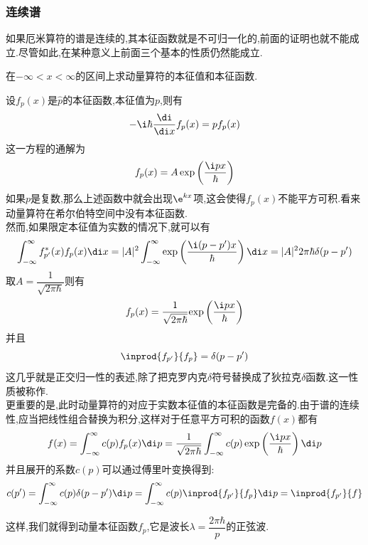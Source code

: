 \documentclass{ctexart}
\begin{document}
\subsubsection{连续谱}
如果厄米算符的谱是连续的,其本征函数就是不可归一化的,前面的证明也就不能成立.尽管如此,在某种意义上前面三个基本的性质仍然能成立.
\begin{problem}
    在$-\infty<x<\infty$的区间上求动量算符的本征值和本征函数.
\end{problem}
\begin{solution}
    设$f_p(x)$是$\hat{p}$的本征函数,本征值为$p$,则有
    \[-\i\hbar\dfrac{\di}{\di x}f_p(x)=pf_p(x)\]
    这一方程的通解为
    \[f_p(x)=A\exp\left(\dfrac{\i px}{\hbar}\right)\]
    如果$p$是复数,那么上述函数中就会出现$\e^{kx}$项,这会使得$f_p(x)$不能平方可积.看来动量算符在希尔伯特空间中没有本征函数.\\
    然而,如果限定本征值为实数的情况下,就可以有
    \[\int_{-\infty}^{\infty}f^\ast_{p'}(x)f_p(x)\di x=|A|^2\int_{-\infty}^{\infty}\exp\left(\dfrac{\i(p-p')x}{\hbar}\right)\di x=|A|^22\pi\hbar\delta(p-p')\]
    取$A=\dfrac{1}{\sqrt{2\pi\hbar}}$则有
    \[f_p(x)=\dfrac{1}{\sqrt{2\pi\hbar}}{\exp\left(\dfrac{\i px}{\hbar}\right)}\]
    并且
    \[\inprod{f_{p'}}{f_p}=\delta(p-p')\]
    这几乎就是正交归一性的表述,除了把克罗内克$\delta$符号替换成了狄拉克$\delta$函数.这一性质被称作.\\
    更重要的是,此时动量算符的对应于实数本征值的本征函数是完备的.由于谱的连续性,应当把线性组合替换为积分,这样对于任意平方可积的函数$f(x)$都有
    \[f(x)=\int_{-\infty}^{\infty}c(p)f_p(x)\di p=\dfrac{1}{\sqrt{2\pi\hbar}}\int_{-\infty}^{\infty}c(p)\exp\left(\dfrac{\i px}{\hbar}\right)\di p\]
    并且展开的系数$c(p)$可以通过傅里叶变换得到:
    \[c(p')=\int_{-\infty}^{\infty}c(p)\delta(p-p')\di p=\int_{-\infty}^{\infty}c(p)\inprod{f_{p'}}{f_p}\di p=\inprod{f_{p'}}{f}\]
\end{solution}
这样,我们就得到动量本征函数$f_p$,它是波长$\lambda=\dfrac{2\pi\hbar}{p}$的正弦波.
\end{document}
